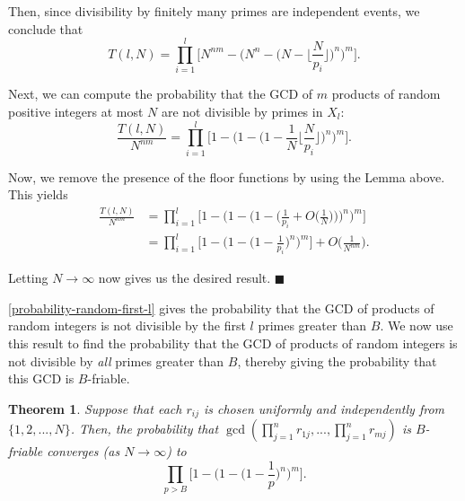 \documentclass[10pt,a4paper]{article}
\newtheorem{theorem}{Theorem}[section]
\theoremstyle{definition}
\theoremstyle{remark}
\begin{document}
Then, since divisibility by finitely many primes are independent events, we conclude that
$$T(l, N) = \prod_{i=1}^l \Big[N^{nm} - \Big(N^n - \Big(N - \Big\lfloor\frac{N}{p_i}\Big\rfloor\Big)^n\Big)^m\Big].$$

Next, we can compute the probability that the GCD of $m$ products of random positive integers at most $N$ are not divisible by primes in $X_l$:
$$\frac{T(l, N)}{N^{nm}} = \prod_{i=1}^l \Big[1 - \Big(1 - \Big(1 - \frac{1}{N}\Big\lfloor\frac{N}{p_i}\Big\rfloor\Big)^n\Big)^m\Big].$$

Now, we remove the presence of the floor functions by using the Lemma above. This yields
\begin{align*} \frac{T(l, N)}{N^{nm}} &= \prod_{i=1}^l \Big[1 - \Big(1 - \Big(1 - \Big(\frac{1}{p_i} + O\Big(\frac{1}{N}\Big)\Big) \Big)^n\Big)^m\Big]\\
&= \prod_{i=1}^l \Big[1 - \Big(1 - \Big(1 - \frac{1}{p_i}  \Big)^n\Big)^m\Big] + O\Big(\frac{1}{N^{nm}}\Big).\end{align*}

\noindent Letting $N \to \infty$ now gives us the desired result. $\blacksquare$
\vspace{.2 in}

\cref{probability-random-first-l} gives the probability that the GCD of products of random integers is not divisible by the first \(l\) primes greater than \(B\). We now use this result to find the probability that the GCD of products of random integers is not divisible by \textit{all} primes greater than $B$, thereby giving the probability that this GCD is $B$-friable.

\begin{theorem} Suppose that each $r_{ij}$ is chosen uniformly and independently from $\{1, 2, ..., N\}$. Then, the probability that $\gcd(\prod_{j=1}^n r_{1j}, ... , \prod_{j=1}^n r_{mj})$ is $B$-friable converges (as $N \to \infty$) to
$$\prod_{p>B} \Big[1 - \Big(1 - \Big(1 - \frac{1}{p}\Big)^n \Big)^m \Big].$$
\end{theorem}
\end{document}
